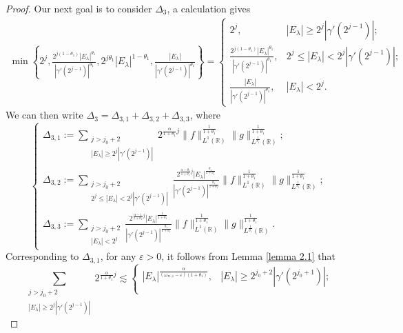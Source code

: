 \documentclass[10pt,a4paper]{amsart}
\begin{document}
\begin{proof}
Our next goal is to consider $\Delta_{3}$, a calculation gives
\begin{align*}
\min\left\{2^j,\frac{2^{j(1-\theta_{1})}|E_\lambda|^{\theta_1}}{|\gamma'(2^{j-1})|^{\theta_{1}}},2^{j\theta_1} |E_\lambda|^{1-\theta_1},\frac{|E_\lambda|}{|\gamma'(2^{j-1})|^{\theta_1}}\right\}=
 \begin{cases}
   2^j, &  |E_\lambda|\geq2^j|\gamma'(2^{j-1})|; \\
   \frac{2^{j(1-\theta_{1})}|E_\lambda|^{\theta_1}}{|\gamma'(2^{j-1})|^{\theta_{1}}},&2^j\leq|E_\lambda|<2^j|\gamma'(2^{j-1})|;\\
  \frac{|E_\lambda|}{|\gamma'(2^{j-1})|^{\theta_1}} , & |E_\lambda|<2^j.
 \end{cases}
 \end{align*}
We can then write $\Delta_{3}=\Delta_{3,1}+\Delta_{3,2}+\Delta_{3,3}$, where
$$\begin{cases}
   \Delta_{3,1}:= \sum\limits_{  \substack{j>j_{0}+2   \\|E_\lambda|\geq2^j|\gamma'(2^{j-1})|  }}    2^{{\frac{\alpha}{1+\theta_{1}}}j}
\|f\|_{L^{1}(\mathbb{R})}^{\frac{1}{1+\theta_{1}}}\|g\|_{L^{\frac{1}{\theta_1}}(\mathbb{R})}^{\frac{1}{1+\theta_{1}}}; \\
   \Delta_{3,2}:=\sum\limits_{  \substack{j>j_{0}+2   \\2^j\leq|E_\lambda|<2^j|\gamma'(2^{j-1})|  }}   {\frac{2^{{\frac{\alpha-\theta_{1}}{1+\theta_{1}}}j}|E_\lambda|^{\frac{\theta_{1}}{1+\theta_{1}}}}{|\gamma'(2^{j-1})|^{\frac{\theta_{1}}{1+\theta_{1}}}}} \|f\|_{L^{1}(\mathbb{R})}^{\frac{1}{1+\theta_{1}}}\|g\|_{L^{\frac{1}{\theta_1}}(\mathbb{R})}^{\frac{1}{1+\theta_{1}}};\\
 \Delta_{3,3}:=\sum\limits_{  \substack{j>j_{0}+2   \\|E_\lambda|<2^j}}   {\frac{2^{{\frac{\alpha-1}{1+\theta_{1}}}j}|E_\lambda|^{\frac{1}{1+\theta_{1}}}}{|\gamma'(2^{j-1})|^{\frac{\theta_{1}}{1+\theta_{1}}}}}
 \|f\|_{L^{1}(\mathbb{R})}^{\frac{1}{1+\theta_{1}}}\|g\|_{L^{\frac{1}{\theta_1}}(\mathbb{R})}^{\frac{1}{1+\theta_{1}}}.
 \end{cases}$$
Corresponding to $\Delta_{3,1}$, for any $\varepsilon>0$, it follows from Lemma \ref{lemma 2.1} that
$$\sum\limits_{  \substack{j>j_{0}+2   \\|E_\lambda|\geq2^j|\gamma'(2^{j-1})|  }}    2^{{\frac{\alpha}{1+\theta_{1}}}j}\lesssim
\begin{cases}
   |E_\lambda|^{\frac{\alpha}{(\omega_{\infty,1}-\varepsilon)(1+\theta_{1})}}, & |E_\lambda|\geq2^{j_0+2}|\gamma'(2^{j_0+1})|; \\

\end{cases}$$
\end{proof}
\end{document}
